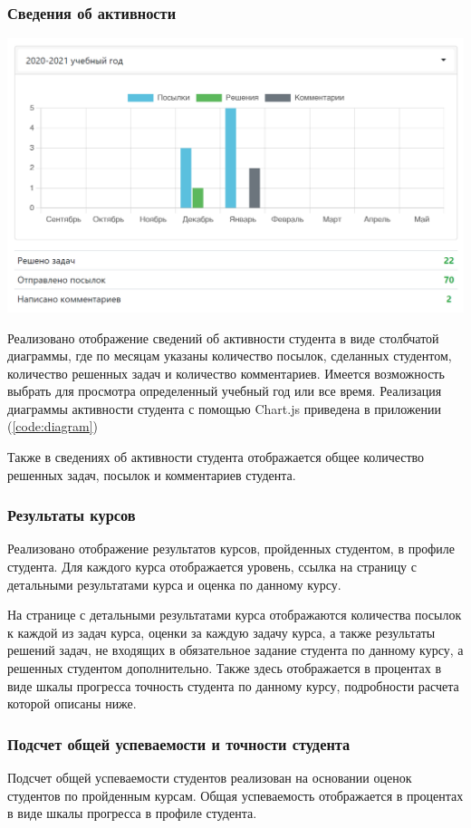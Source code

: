 \documentclass[12pt, a4paper, oneside]{article}
\begin{document}
\subsubsection{Сведения об активности}
\begin{center}
    \includegraphics[scale=0.4]{account-activity}
\end{center}

Реализовано отображение сведений об активности студента в виде столбчатой диаграммы, где по месяцам указаны количество посылок, сделанных студентом, количество решенных задач и количество комментариев. Имеется возможность выбрать для просмотра определенный учебный год или все время. Реализация диаграммы активности студента с помощью Chart.js приведена в приложении (\ref{code:diagram})

Также в сведениях об активности студента отображается общее количество решенных задач, посылок и комментариев студента.
\subsubsection{Результаты курсов}
Реализовано отображение результатов курсов, пройденных студентом, в профиле студента. Для каждого курса отображается уровень, ссылка на страницу с детальными результатами курса и оценка по данному курсу.

На странице с детальными результатами курса отображаются количества посылок к каждой из задач курса, оценки за каждую задачу курса, а также результаты решений задач, не входящих в обязательное задание студента по данному курсу, а решенных студентом дополнительно. Также здесь отображается в процентах в виде шкалы прогресса точность студента по данному курсу, подробности расчета которой описаны ниже.
\subsubsection{Подсчет общей успеваемости и точности студента}
Подсчет общей успеваемости студентов реализован на основании оценок студентов по пройденным курсам. Общая успеваемость отображается в процентах в виде шкалы прогресса в профиле студента.
\end{document}
